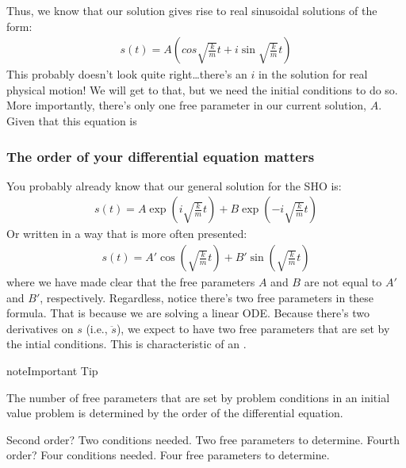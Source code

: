 \documentclass[letterpaper,10pt,english]{jupyterBook}
\begin{document}
\sphinxAtStartPar
Thus, we know that our solution gives rise to real sinusoidal solutions of the form:
\begin{equation*}
\begin{split}s(t) = A\left(cos{\sqrt{\frac{k}{m}} t} + i\sin{\sqrt{\frac{k}{m}} t}\right)\end{split}
\end{equation*}
\sphinxAtStartPar
This probably doesn’t look quite right…there’s an \(i\) in the solution for real physical motion! We will get to that, but we need the initial conditions to do so. More importantly, there’s only one free parameter in our current solution, \(A\). Given that this equation is 


\subsubsection{The order of your differential equation matters}
\label{\detokenize{content/2_oscillations/readings-SHO-intro:the-order-of-your-differential-equation-matters}}
\sphinxAtStartPar
You probably already know that our general solution for the SHO is:
\begin{equation*}
\begin{split}s(t) = A\exp(i\sqrt{\frac{k}{m}} t) + B\exp(-i\sqrt{\frac{k}{m}} t)\end{split}
\end{equation*}
\sphinxAtStartPar
Or written in a way that is more often presented:
\begin{equation*}
\begin{split}s(t) = A'\cos(\sqrt{\frac{k}{m}} t) + B'\sin(\sqrt{\frac{k}{m}} t)\end{split}
\end{equation*}
\sphinxAtStartPar
where we have made clear that the free parameters \(A\) and \(B\) are not equal to \(A'\) and \(B'\), respectively. Regardless, notice there’s two free parameters in these formula. That is because we are solving a  linear ODE. Because there’s two derivatives on \(s\) (i.e., \(\ddot{s}\)), we expect to have two free parameters that are set by the intial conditions. This is characteristic of an .

\begin{sphinxadmonition}{note}{Important Tip}

\sphinxAtStartPar
The number of free parameters that are set by problem conditions in an initial value problem is determined by the order of the differential equation.

\sphinxAtStartPar
Second order? Two conditions needed. Two free parameters to determine. Fourth order? Four conditions needed. Four free parameters to determine.
\end{sphinxadmonition}
\end{document}
